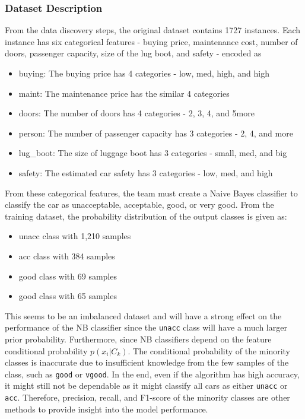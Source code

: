 \documentclass[a4paper]{article}
\begin{document}
\subsubsection{Dataset Description}
From the data discovery steps, the original dataset contains 1727 instances. Each instance has six categorical features - buying price, maintenance cost, number of doors, passenger capacity, size of the lug boot, and safety - encoded as 

\begin{itemize}
    \item buying: The buying price has 4 categories - low, med, high, and high
    \item  maint: The maintenance price has the similar 4 categories
    \item doors: The number of doors has 4 categories - 2, 3, 4, and 5more
    \item person: The number of passenger capacity has 3 categories - 2, 4, and more
    \item lug\_boot: The size of luggage boot has 3 categories - small, med, and big
    \item safety: The estimated car safety has 3 categories - low, med, and high
\end{itemize}

From these categorical features, the team must create a Naive Bayes classifier to classify the car as unacceptable, acceptable, good, or very good. From the training dataset, the probability distribution of the output classes is given as:

\begin{itemize}
    \item unacc class with 1,210 samples
    \item acc class with 384 samples
    \item good class with 69 samples
    \item good class with 65 samples
\end{itemize}

This seems to be an imbalanced dataset and will have a strong effect on the performance of the NB classifier since the \lstinline{unacc} class will have a much larger prior probability. Furthermore, since NB classifiers depend on the feature conditional probability $p(x_i|C_k)$. The conditional probability of the minority classes is inaccurate due to insufficient knowledge from the few samples of the class, such as \lstinline{good} or \lstinline{vgood}. In the end, even if the algorithm has high accuracy, it might still not be dependable as it might classify all cars as either \lstinline{unacc} or \lstinline{acc}. Therefore, precision, recall, and F1-score of the minority classes are other methods to provide insight into the model performance.
\end{document}
